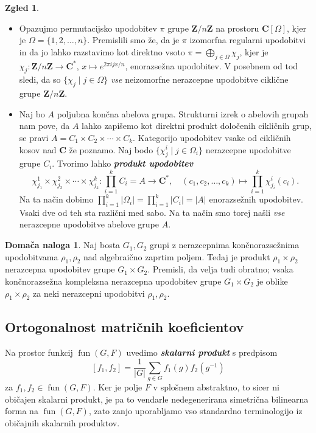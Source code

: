 \documentclass[11pt]{book}
\def\ZZ{\mathbf{Z}}
\def\CC{\mathbf{C}}
\DeclareMathOperator\fun{fun}
\def\definicija{\color{rdeca}\bf\em}
\theoremstyle{definition}
\theoremstyle{zgled}
\newtheorem*{zgled}{Zgled}
\theoremstyle{odprtproblem}
\theoremstyle{domacanaloga}
\newtheorem*{domacanaloga}{Domača naloga}
\theoremstyle{izrek}
\begin{document}
\begin{zgled} \leavevmode
\begin{itemize}
    \item Opazujmo permutacijsko upodobitev $\pi$ grupe $\ZZ/n\ZZ$ na prostoru $\CC[\Omega]$, kjer je $\Omega = \{ 1, 2, \dots, n \}$. Premislili smo že, da je $\pi$ izomorfna regularni upodobitvi in da jo lahko razstavimo kot direktno vsoto $\pi = \bigoplus_{j \in \Omega} \chi_j$, kjer je $\chi_j \colon \ZZ/n\ZZ \to \CC^*$, $x \mapsto e^{2 \pi i j x / n}$, enorazsežna upodobitev. V posebnem od tod sledi, da so $\{ \chi_j \mid j \in \Omega \}$ \emph{vse} neizomorfne nerazcepne upodobitve ciklične grupe $\ZZ/n\ZZ$.

    \item Naj bo $A$ poljubna končna abelova grupa. Strukturni izrek o abelovih grupah nam pove, da $A$ lahko zapišemo kot direktni produkt določenih cikličnih grup, se pravi $A = C_1 \times C_2 \times \cdots \times C_k$. Kategorijo upodobitev vsake od cikličnih kosov nad $\CC$ že poznamo. Naj bodo $\{ \chi^i_j \mid j \in \Omega_i \}$ nerazcepne upodobitve grupe $C_i$. Tvorimo lahko {\definicija produkt upodobitev}
    \[
        \chi^1_{j_1} \times \chi^2_{j_2} \times \cdots \times \chi^k_{j_k} \colon \prod_{i=1}^k C_i = A \to \CC^*, \quad
        (c_1, c_2, \dots, c_k) \mapsto \prod_{i = 1}^k \chi^i_{j_i}(c_i).
    \]
    Na ta način dobimo $\prod_{i=1}^k |\Omega_i| = \prod_{i=1}^k |C_i| = |A|$ enorazsežnih upodobitev. Vsaki dve od teh sta različni med sabo. Na ta način smo torej našli \emph{vse} nerazcepne upodobitve abelove grupe $A$.
\end{itemize}
\end{zgled}

\begin{domacanaloga}
Naj bosta $G_1, G_2$ grupi z nerazcepnima končnorazsežnima upodobitvama $\rho_1, \rho_2$ nad algebraično zaprtim poljem. Tedaj je produkt $\rho_1 \times \rho_2$ nerazcepna upodobitev grupe $G_1 \times G_2$. Premisli, da velja tudi obratno; vsaka končnorazsežna kompleksna nerazcepna upodobitev grupe $G_1 \times G_2$ je oblike $\rho_1 \times \rho_2$ za neki nerazcepni upodobitvi $\rho_1, \rho_2$.
\end{domacanaloga}

\subsection{Ortogonalnost matričnih koeficientov}

Na prostor funkcij $\fun(G,F)$ uvedimo {\definicija skalarni produkt} s predpisom
\[
    [ f_1, f_2 ] = \frac{1}{|G|} \sum_{g \in G} f_1(g) f_2(g^{-1})
\]
za $f_1, f_2 \in \fun(G,F)$. Ker je polje $F$ v splošnem abstraktno, to sicer ni običajen skalarni produkt, je pa to vendarle nedegenerirana simetrična bilinearna forma na $\fun(G,F)$, zato zanjo uporabljamo vso standardno terminologijo iz običajnih skalarnih produktov.
\end{document}

